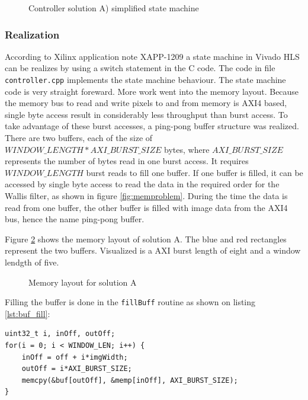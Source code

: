 \begin{figure}[H]
    \centering
    \begin{adjustbox}{scale=1}
        
    \end{adjustbox}
    \caption{Controller solution A) simplified state machine}
    \label{fig:controllerfsm}
\end{figure}

\subsubsection*{Realization}
According to Xilinx application note XAPP-1209 \cite{xapp1209} a state
machine in Vivado HLS can be realizes by using a switch statement in the C code.
The code in file \texttt{controller.cpp} implements the state machine behaviour.
The state machine code is very straight foreward. More work went into the memory
layout. Because the memory bus to read and write pixels to and from memory is
AXI4 based, single byte access result in considerably less throughput than
burst access.
To take advantage of these burst accesses, a ping-pong buffer structure was
realized. There are two buffers, each of the size of $WINDOW\_LENGTH *
AXI\_BURST\_SIZE$ bytes, where $AXI\_BURST\_SIZE$ represents the number of bytes
read
in one burst access. It requires $WINDOW\_LENGTH$ burst reads to fill one
buffer. If one buffer is filled, it can be accessed by single byte access to
read the data in the required order for the Wallis filter, as shown in figure
\ref{fig:memproblem}. During the time the data is read from one buffer, the
other buffer is filled with image data from the AXI4 bus, hence the name
ping-pong buffer. 

Figure \ref{fig:solamemlayout} shows the memory layout of
solution A. The blue and red rectangles represent the two buffers. Visualized is
a AXI burst length of eight and a window lendgth of five.

\begin{figure}[tb!]
    \centering
    \begin{adjustbox}{scale=0.7}
        
    \end{adjustbox}
    \caption{Memory layout for solution A}
    \label{fig:solamemlayout}
\end{figure}

Filling the buffer is done in the \texttt{fillBuff} routine
as shown on listing \ref{lst:buf_fill}:

\begin{minipage}{\textwidth}
\begin{lstlisting}[style=CStyle, caption=Buffer fill simplified,
label=lst:buf_fill]
uint32_t i, inOff, outOff;
for(i = 0; i < WINDOW_LEN; i++) {
    inOff = off + i*imgWidth;
    outOff = i*AXI_BURST_SIZE;
    memcpy(&buf[outOff], &memp[inOff], AXI_BURST_SIZE);
}\end{lstlisting}
\end{minipage}

